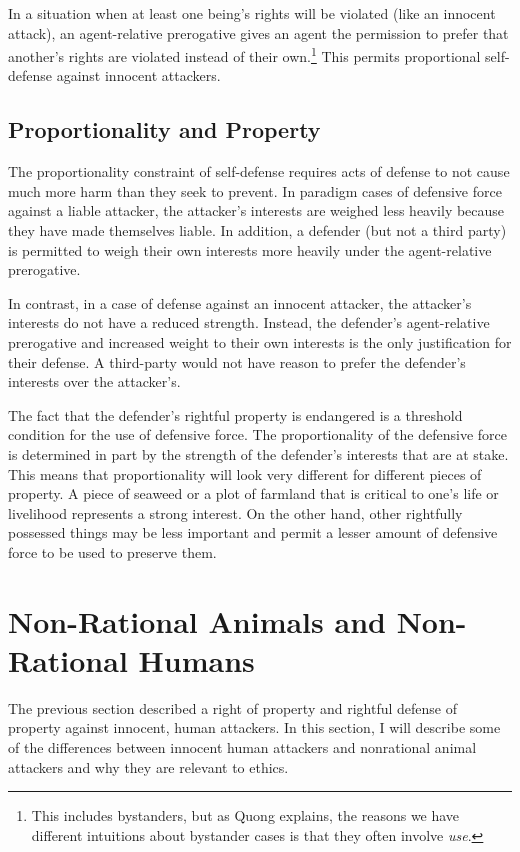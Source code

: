 	In a situation when at least one being’s rights will be violated (like an
	innocent attack), an agent-relative prerogative gives an agent the
	permission to prefer that another’s rights are violated instead of their
	own.\footnote{This includes bystanders, but as Quong explains, the reasons
	we have different intuitions about bystander cases is that they often
	involve \emph{use}.} This permits proportional self-defense against innocent
	attackers.
	
	\subsection{Proportionality and Property}

	The proportionality constraint of self-defense requires acts of defense
	to not cause much more harm than they seek to prevent. In paradigm cases
	of defensive force against a liable attacker, the attacker’s interests
	are weighed less heavily because they have made themselves liable. In
	addition, a defender (but not a third party) is permitted to weigh their
	own interests more heavily under the agent-relative prerogative.

	In contrast, in a case of defense against an innocent attacker, the
	attacker’s interests do not have a reduced strength. Instead, the defender’s
	agent-relative prerogative and increased weight to their own interests is
	the only justification for their defense. A third-party would not have
	reason to prefer the defender’s interests over the attacker’s.

	The fact that the defender’s rightful property is endangered is a threshold
	condition for the use of defensive force. The proportionality of the
	defensive force is determined in part by the strength of the defender’s
	interests that are at stake. This means that proportionality will look very
	different for different pieces of property. A piece of seaweed or a plot of
	farmland that is critical to one’s life or livelihood represents a strong
	interest. On the other hand, other rightfully possessed things may be less
	important and permit a lesser amount of defensive force to be used to
	preserve them.

\section{Non-Rational Animals and Non-Rational Humans}
 
	The previous section described a right of property and rightful defense
	of property against innocent, human attackers. In this section, I will
	describe some of the differences between innocent human attackers and
	nonrational animal attackers and why they are relevant to ethics.
    
